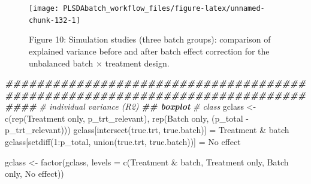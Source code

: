 \documentclass[
]{book}
\newenvironment{Shaded}{\begin{snugshade}}{\end{snugshade}}
\newcommand{\AttributeTok}[1]{\textcolor[rgb]{0.77,0.63,0.00}{#1}}
\newcommand{\CommentTok}[1]{\textcolor[rgb]{0.56,0.35,0.01}{\textit{#1}}}
\newcommand{\DecValTok}[1]{\textcolor[rgb]{0.00,0.00,0.81}{#1}}
\newcommand{\DocumentationTok}[1]{\textcolor[rgb]{0.56,0.35,0.01}{\textbf{\textit{#1}}}}
\newcommand{\FunctionTok}[1]{\textcolor[rgb]{0.00,0.00,0.00}{#1}}
\newcommand{\NormalTok}[1]{#1}
\newcommand{\OtherTok}[1]{\textcolor[rgb]{0.56,0.35,0.01}{#1}}
\newcommand{\SpecialCharTok}[1]{\textcolor[rgb]{0.00,0.00,0.00}{#1}}
\newcommand{\StringTok}[1]{\textcolor[rgb]{0.31,0.60,0.02}{#1}}
\begin{document}
\begin{figure}

{\centering \texttt{[image: PLSDAbatch\_workflow\_files/figure-latex/unnamed-chunk-132-1]} 

}

\caption{Figure 10: Simulation studies (three batch groups): comparison of explained variance before and after batch effect correction for the unbalanced batch × treatment design.}\label{fig:unnamed-chunk-132}
\end{figure}

\begin{Shaded}
\begin{Highlighting}[]
\DocumentationTok{\#\#\#\#\#\#\#\#\#\#\#\#\#\#\#\#\#\#\#\#\#\#\#\#\#\#\#\#\#\#\#\#\#\#\#\#\#\#\#\#\#\#\#\#\#\#\#\#\#\#\#\#\#\#\#\#\#\#\#\#\#\#\#\#\#\#\#\#\#\#\#\#\#\#\#\#\#\#\#\#}
\CommentTok{\# individual variance (R2)}
\DocumentationTok{\#\# boxplot}
\CommentTok{\# class}
\NormalTok{gclass }\OtherTok{\textless{}{-}} \FunctionTok{c}\NormalTok{(}\FunctionTok{rep}\NormalTok{(}\StringTok{\textquotesingle{}Treatment only\textquotesingle{}}\NormalTok{, p\_trt\_relevant), }
            \FunctionTok{rep}\NormalTok{(}\StringTok{\textquotesingle{}Batch only\textquotesingle{}}\NormalTok{, (p\_total }\SpecialCharTok{{-}}\NormalTok{ p\_trt\_relevant)))}
\NormalTok{gclass[}\FunctionTok{intersect}\NormalTok{(true.trt, true.batch)] }\OtherTok{=} \StringTok{\textquotesingle{}Treatment \& batch\textquotesingle{}}
\NormalTok{gclass[}\FunctionTok{setdiff}\NormalTok{(}\DecValTok{1}\SpecialCharTok{:}\NormalTok{p\_total, }\FunctionTok{union}\NormalTok{(true.trt, true.batch))] }\OtherTok{=} \StringTok{\textquotesingle{}No effect\textquotesingle{}}

\NormalTok{gclass }\OtherTok{\textless{}{-}} \FunctionTok{factor}\NormalTok{(gclass, }\AttributeTok{levels =} \FunctionTok{c}\NormalTok{(}\StringTok{\textquotesingle{}Treatment \& batch\textquotesingle{}}\NormalTok{, }
                                    \StringTok{\textquotesingle{}Treatment only\textquotesingle{}}\NormalTok{, }
                                    \StringTok{\textquotesingle{}Batch only\textquotesingle{}}\NormalTok{, }
                                    \StringTok{\textquotesingle{}No effect\textquotesingle{}}\NormalTok{))}


\end{Highlighting}
\end{Shaded}
\end{document}
